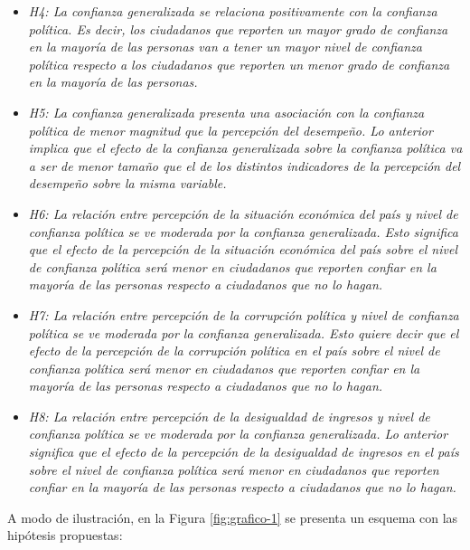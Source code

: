 \documentclass[12pt,twoside]{templates/facsothesis}
\begin{document}
\begin{itemize}
\item
  \emph{H4: La confianza generalizada se relaciona positivamente con la confianza política. Es decir, los ciudadanos que reporten un mayor grado de confianza en la mayoría de las personas van a tener un mayor nivel de confianza política respecto a los ciudadanos que reporten un menor grado de confianza en la mayoría de las personas.}
\item
  \emph{H5: La confianza generalizada presenta una asociación con la confianza política de menor magnitud que la percepción del desempeño. Lo anterior implica que el efecto de la confianza generalizada sobre la confianza política va a ser de menor tamaño que el de los distintos indicadores de la percepción del desempeño sobre la misma variable.}
\item
  \emph{H6: La relación entre percepción de la situación económica del país y nivel de confianza política se ve moderada por la confianza generalizada. Esto significa que el efecto de la percepción de la situación económica del país sobre el nivel de confianza política será menor en ciudadanos que reporten confiar en la mayoría de las personas respecto a ciudadanos que no lo hagan.}
\item
  \emph{H7: La relación entre percepción de la corrupción política y nivel de confianza política se ve moderada por la confianza generalizada. Esto quiere decir que el efecto de la percepción de la corrupción política en el país sobre el nivel de confianza política será menor en ciudadanos que reporten confiar en la mayoría de las personas respecto a ciudadanos que no lo hagan.}
\item
  \emph{H8: La relación entre percepción de la desigualdad de ingresos y nivel de confianza política se ve moderada por la confianza generalizada. Lo anterior significa que el efecto de la percepción de la desigualdad de ingresos en el país sobre el nivel de confianza política será menor en ciudadanos que reporten confiar en la mayoría de las personas respecto a ciudadanos que no lo hagan.}
\end{itemize}

A modo de ilustración, en la Figura \ref{fig:grafico-1} se presenta un esquema con las hipótesis propuestas:
\end{document}
